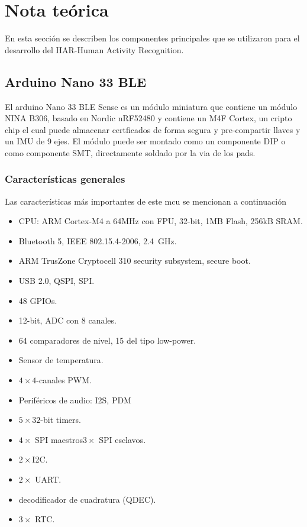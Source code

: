 \section{Nota teórica}
En esta sección se describen los componentes principales que se utilizaron para el desarrollo del HAR-Human Activity Recognition.
\subsection*{ Arduino Nano 33 BLE}
El arduino Nano 33 BLE Sense es un módulo miniatura que contiene un módulo NINA B306, basado en Nordic nRF52480 y contiene un M4F Cortex, un cripto chip el cual puede almacenar certficados de forma segura y pre-compartir llaves y un IMU de 9 ejes. El módulo puede ser montado como un componente DIP o como componente SMT, directamente soldado por la via de los pads.
\subsubsection*{Características generales}
Las características más importantes de este mcu se mencionan a continuación \cite{web}
\begin{multicols}{2}
 \begin{itemize}
    \item CPU: ARM Cortex-M4 a 64MHz con FPU, 32-bit, 1MB Flash, 256kB SRAM.
    \item Bluetooth 5, IEEE 802.15.4-2006, \SI{2.4}{\giga\Hz}.
    \item ARM TrusZone Cryptocell 310 security subsystem, secure boot.
    \item USB 2.0, QSPI, SPI.
    \item 48 GPIOs.
    \item 12-bit, ADC con 8 canales.
    \item 64 comparadores de nivel, 15 del tipo low-power.
    \item Sensor de temperatura.
    \item $4\times4$-canales PWM.
    \item Periféricos de audio: I2S, PDM
    \item $5\times32$-bit timers.
    \item $4\times$ SPI maestros\/$3\times$ SPI esclavos.
    \item $2\times$I2C.
    \item $2\times$ UART.
    \item decodificador de cuadratura (QDEC).
    \item $3\times$ RTC.
\end{itemize}   
\end{multicols}
\newpage
